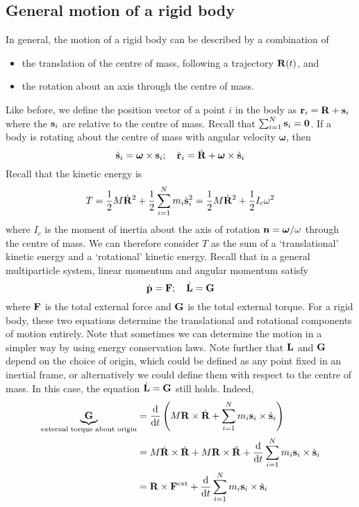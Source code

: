 \subsection{General motion of a rigid body}
In general, the motion of a rigid body can be described by a combination of
\begin{itemize}
	\item the translation of the centre of mass, following a trajectory \(\vb R(t)\), and
	\item the rotation about an axis through the centre of mass.
\end{itemize}
Like before, we define the position vector of a point \(i\) in the body as \(\vb r_i = \vb R + \vb s_i\) where the \(\vb s_i\) are relative to the centre of mass.
Recall that \(\sum_{i=1}^N \vb s_i = \vb 0\).
If a body is rotating about the centre of mass with angular velocity \(\bm\omega\), then
\[
	\dot{\vb s}_i = \bm\omega \times \vb s_i;\quad \dot{\vb r}_i = \dot{\vb R} + \bm\omega \times \dot{\vb s}_i
\]
Recall that the kinetic energy is
\[
	T = \frac{1}{2}M \dot{\vb R}^2 + \frac{1}{2}\sum_{i=1}^N m_i \dot{\vb s}_i^2 = \frac{1}{2}M \dot{\vb R}^2 + \frac{1}{2}I_c \omega^2
\]
where \(I_c\) is the moment of inertia about the axis of rotation \(\vb n = \bm\omega / \omega\) through the centre of mass.
We can therefore consider \(T\) as the sum of a `translational' kinetic energy and a `rotational' kinetic energy.
Recall that in a general multiparticle system, linear momentum and angular momentum satisfy
\[
	\dot{\vb p} = \vb F;\quad \dot{\vb L} = \vb G
\]
where \(\vb F\) is the total external force and \(\vb G\) is the total external torque.
For a rigid body, these two equations determine the translational and rotational components of motion entirely.
Note that sometimes we can determine the motion in a simpler way by using energy conservation laws.
Note further that \(\vb L\) and \(\vb G\) depend on the choice of origin, which could be defined as any point fixed in an inertial frame, or alternatively we could define them with respect to the centre of mass.
In this case, the equation \(\dot{\vb L} = \vb G\) still holds.
Indeed,
\begin{align*}
	\underbrace{\vb G}_{\text{external torque about origin}} & = \dv{t} \left( M \vb R \times \dot{\vb R} + \sum_{i=1}^N m_i \vb s_i \times \dot{\vb s}_i \right)                      \\
	                                                         & = M \dot{\vb R} \times \dot{\vb R} + M \vb R \times \ddot{\vb R} + \dv{t} \sum_{i=1}^N m_i \vb s_i \times \dot{\vb s}_i \\
	                                                         & = \vb R \times \vb F^\text{ext} + \dv{t} \sum_{i=1}^N m_i \vb s_i \times \dot{\vb s}_i
\end{align*}
